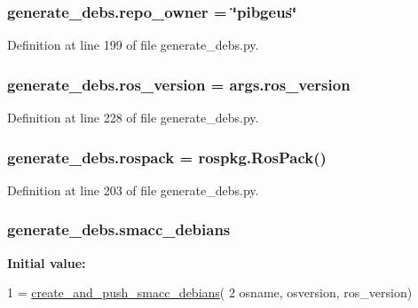 \subsubsection[{\texorpdfstring{repo\+\_\+owner}{repo_owner}}]{\setlength{\rightskip}{0pt plus 5cm}generate\+\_\+debs.\+repo\+\_\+owner = \char`\"{}pibgeus\char`\"{}}\hypertarget{namespacegenerate__debs_a23479dba5af50c90f3346b04d441ab2b}{}\label{namespacegenerate__debs_a23479dba5af50c90f3346b04d441ab2b}


Definition at line 199 of file generate\+\_\+debs.\+py.

\subsubsection[{\texorpdfstring{ros\+\_\+version}{ros_version}}]{\setlength{\rightskip}{0pt plus 5cm}generate\+\_\+debs.\+ros\+\_\+version = args.\+ros\+\_\+version}\hypertarget{namespacegenerate__debs_af69f35c2a04a4cc8bd6b9805ab436872}{}\label{namespacegenerate__debs_af69f35c2a04a4cc8bd6b9805ab436872}


Definition at line 228 of file generate\+\_\+debs.\+py.

\subsubsection[{\texorpdfstring{rospack}{rospack}}]{\setlength{\rightskip}{0pt plus 5cm}generate\+\_\+debs.\+rospack = rospkg.\+Ros\+Pack()}\hypertarget{namespacegenerate__debs_a609fa33c1ebbff173ec90524eeb7b49d}{}\label{namespacegenerate__debs_a609fa33c1ebbff173ec90524eeb7b49d}


Definition at line 203 of file generate\+\_\+debs.\+py.

\subsubsection[{\texorpdfstring{smacc\+\_\+debians}{smacc_debians}}]{\setlength{\rightskip}{0pt plus 5cm}generate\+\_\+debs.\+smacc\+\_\+debians}\hypertarget{namespacegenerate__debs_a06e0eca4f9d50e67f110b439c402ef44}{}\label{namespacegenerate__debs_a06e0eca4f9d50e67f110b439c402ef44}
{\bfseries Initial value\+:}
\begin{DoxyCode}
1 = \hyperlink{namespacegenerate__debs_af7237c463c8e5b4df369e6befc154c50}{create\_and\_push\_smacc\_debians}(
2         osname, osversion, ros\_version)
\end{DoxyCode}


